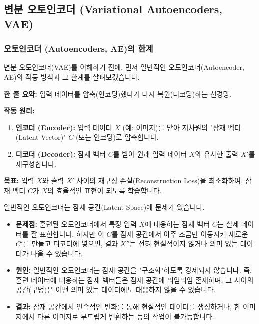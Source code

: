\documentclass[11pt,a4paper]{article}
\begin{document}
\newpage
\subsection{변분 오토인코더 (Variational Autoencoders, VAE)}

\subsubsection{오토인코더 (Autoencoders, AE)의 한계}
변분 오토인코더(VAE)를 이해하기 전에, 먼저 일반적인 오토인코더(Autoencoder, AE)의 작동 방식과 그 한계를 살펴보겠습니다.

\begin{tcolorbox}[conceptbox, title=일반적인 오토인코더 (AE)]
\textbf{한 줄 요약:} 입력 데이터를 압축(인코딩)했다가 다시 복원(디코딩)하는 신경망.

\textbf{작동 원리:}
\begin{enumerate}
    \item \textbf{인코더 (Encoder):} 입력 데이터 $X$ (예: 이미지)를 받아 저차원의 "잠재 벡터(Latent Vector)" $C$ (또는 인코딩)로 압축합니다.
    \item \textbf{디코더 (Decoder):} 잠재 벡터 $C$를 받아 원래 입력 데이터 $X$와 유사한 출력 $X'$를 재구성합니다.
\end{enumerate}
\textbf{목표:} 입력 $X$와 출력 $X'$ 사이의 재구성 손실(Reconstruction Loss)을 최소화하여, 잠재 벡터 $C$가 $X$의 효율적인 표현이 되도록 학습합니다.
\end{tcolorbox}

\begin{tcolorbox}[warningbox, title=오토인코더의 잠재 공간 문제: "구멍(Holes)"]
일반적인 오토인코더는 잠재 공간(Latent Space)에 문제가 있습니다.
\begin{itemize}
    \item \textbf{문제점:} 훈련된 오토인코더에서 특정 입력 $X$에 대응하는 잠재 벡터 $C$는 실제 데이터를 잘 표현합니다. 하지만 이 $C$를 잠재 공간에서 아주 조금만 이동시켜 새로운 $C'$를 만들고 디코더에 넣으면, 결과 $X''$는 전혀 현실적이지 않거나 의미 없는 데이터가 나올 수 있습니다.
    \item \textbf{원인:} 일반적인 오토인코더는 잠재 공간을 "구조화"하도록 강제되지 않습니다. 즉, 훈련 데이터에 대응하는 잠재 벡터들은 잠재 공간에 띄엄띄엄 존재하며, 그 사이의 공간(구멍)은 어떤 의미 있는 데이터에도 대응하지 않을 수 있습니다.
    \item \textbf{결과:} 잠재 공간에서 연속적인 변화를 통해 현실적인 데이터를 생성하거나, 한 이미지에서 다른 이미지로 부드럽게 변환하는 등의 작업이 불가능합니다.
\end{itemize}
\end{tcolorbox}
\end{document}
